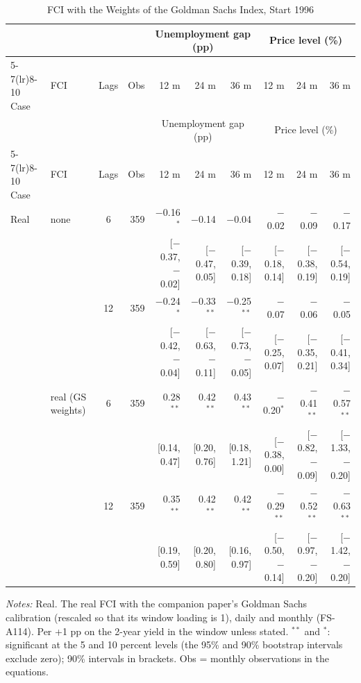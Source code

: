 \begingroup\scriptsize\setlength{\tabcolsep}{0.9pt}
\begin{longtable}{llcrrrrrrr}
\caption{FCI with the Weights of the Goldman Sachs Index, Start 1996}\label{tab:appA5}\\
\toprule
 & & & & \multicolumn{3}{c}{Unemployment gap (pp)} & \multicolumn{3}{c}{Price level (\%)}\\ \cmidrule(lr){5-7}\cmidrule(lr){8-10}
Case & FCI & Lags & Obs & 12 m & 24 m & 36 m & 12 m & 24 m & 36 m\\
\midrule\endfirsthead
\toprule
 & & & & \multicolumn{3}{c}{Unemployment gap (pp)} & \multicolumn{3}{c}{Price level (\%)}\\ \cmidrule(lr){5-7}\cmidrule(lr){8-10}
Case & FCI & Lags & Obs & 12 m & 24 m & 36 m & 12 m & 24 m & 36 m\\
\midrule\endhead
\bottomrule\endfoot
Real & none & 6 & 359 & $-$0.16$^{*}$ & $-$0.14 & $-$0.04 & $-$0.02 & $-$0.09 & $-$0.17\\
 & & & & {\scriptsize [$-$0.37, $-$0.02]} & {\scriptsize [$-$0.47, 0.05]} & {\scriptsize [$-$0.39, 0.18]} & {\scriptsize [$-$0.18, 0.14]} & {\scriptsize [$-$0.38, 0.19]} & {\scriptsize [$-$0.54, 0.19]}\\
 &  & 12 & 359 & $-$0.24$^{*}$ & $-$0.33$^{**}$ & $-$0.25$^{**}$ & $-$0.07 & $-$0.06 & $-$0.05\\
 & & & & {\scriptsize [$-$0.42, $-$0.04]} & {\scriptsize [$-$0.63, $-$0.11]} & {\scriptsize [$-$0.73, $-$0.05]} & {\scriptsize [$-$0.25, 0.07]} & {\scriptsize [$-$0.35, 0.21]} & {\scriptsize [$-$0.41, 0.34]}\\
 & real (GS weights) & 6 & 359 & 0.28$^{**}$ & 0.42$^{**}$ & 0.43$^{**}$ & $-$0.20$^{*}$ & $-$0.41$^{**}$ & $-$0.57$^{**}$\\
 & & & & {\scriptsize [0.14, 0.47]} & {\scriptsize [0.20, 0.76]} & {\scriptsize [0.18, 1.21]} & {\scriptsize [$-$0.38, 0.00]} & {\scriptsize [$-$0.82, $-$0.09]} & {\scriptsize [$-$1.33, $-$0.20]}\\
 &  & 12 & 359 & 0.35$^{**}$ & 0.42$^{**}$ & 0.42$^{**}$ & $-$0.29$^{**}$ & $-$0.52$^{**}$ & $-$0.63$^{**}$\\
 & & & & {\scriptsize [0.19, 0.59]} & {\scriptsize [0.20, 0.80]} & {\scriptsize [0.16, 0.97]} & {\scriptsize [$-$0.50, $-$0.14]} & {\scriptsize [$-$0.97, $-$0.20]} & {\scriptsize [$-$1.42, $-$0.20]}\\
\end{longtable}
\begin{flushleft}\footnotesize\textit{Notes:} Real. The real FCI with the companion paper's Goldman Sachs calibration (rescaled so that its window loading is 1), daily and monthly (FS-A114). Per +1 pp on the 2-year yield in the window unless stated. $^{**}$ and $^{*}$: significant at the 5 and 10 percent levels (the 95\% and 90\% bootstrap intervals exclude zero); 90\% intervals in brackets. Obs = monthly observations in the equations.\end{flushleft}
\endgroup
